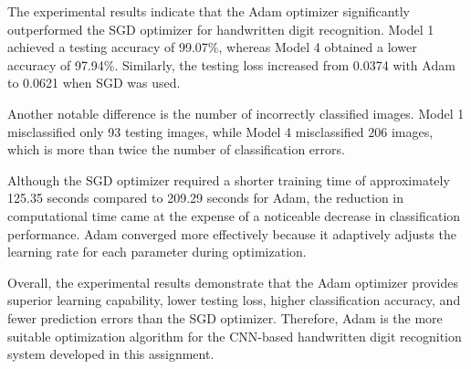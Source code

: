 The experimental results indicate that the Adam optimizer significantly outperformed the SGD optimizer for handwritten digit recognition. Model 1 achieved a testing accuracy of 99.07\%, whereas Model 4 obtained a lower accuracy of 97.94\%. Similarly, the testing loss increased from 0.0374 with Adam to 0.0621 when SGD was used.

Another notable difference is the number of incorrectly classified images. Model 1 misclassified only 93 testing images, while Model 4 misclassified 206 images, which is more than twice the number of classification errors.

Although the SGD optimizer required a shorter training time of approximately 125.35 seconds compared to 209.29 seconds for Adam, the reduction in computational time came at the expense of a noticeable decrease in classification performance. Adam converged more effectively because it adaptively adjusts the learning rate for each parameter during optimization.

Overall, the experimental results demonstrate that the Adam optimizer provides superior learning capability, lower testing loss, higher classification accuracy, and fewer prediction errors than the SGD optimizer. Therefore, Adam is the more suitable optimization algorithm for the CNN-based handwritten digit recognition system developed in this assignment.